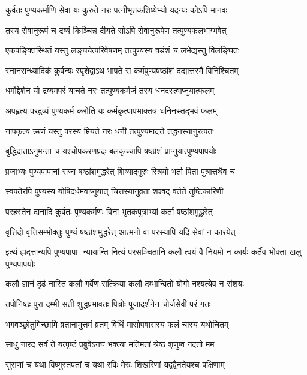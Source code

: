 \twolineshloka
{कुर्वतः पुण्यकर्माणि सेवां यः कुरुते नरः}
{पत्नीभृतकशिष्येभ्यो यदन्यः कोऽपि मानवः} %

\twolineshloka
{तस्य सेवानुरूपं च द्रव्यं किञ्चिन्न दीयते}
{सोऽपि सेवानुरूपेण तत्पुण्यफलभाग्भवेत्} %

\twolineshloka
{एकपङ्क्तिस्थितं यस्तु लङ्घयेत्परिवेषणम्}
{तत्पुण्यस्य षडंशं च लभेद्यस्तु विलङ्घितः} %

\twolineshloka
{स्नानसन्ध्यादिकं कुर्वन्यः स्पृशेद्वाऽथ भाषते}
{स कर्मपुण्यषष्ठांशं दद्यात्तस्मै विनिश्चितम्} %

\twolineshloka
{धर्मोद्देशेन यो द्रव्यमपरं याचते नरः}
{तत्पुण्यकर्मजं तस्य धनदस्त्वाप्नुयात्फलम्} %

\twolineshloka
{अपहृत्य परद्रव्यं पुण्यकर्म करोति यः}
{कर्मकृत्पापभाक्तत्र धनिनस्तद्भवं फलम्} %

\twolineshloka
{नापकृत्य ऋणं यस्तु परस्य म्रियते नरः}
{धनी तत्पुण्यमादत्ते तद्धनस्यानुरूपतः} %

\twolineshloka
{बुद्धिदाताऽनुमन्ता च यश्चोपकरणप्रदः}
{बलकृच्चापि षष्ठांशं प्राप्नुयात्पुण्यपापयोः} %

\twolineshloka
{प्रजाभ्यः पुण्यपापानां राजा षष्ठांशमुद्धरेत्}
{शिष्याद्गुरुः स्त्रियो भर्ता पिता पुत्रात्तथैव च} %

\twolineshloka
{स्वपतेरपि पुण्यस्य योषिदर्धमवाप्नुयात्}
{चित्तस्यानुव्रता शश्वद् वर्तते तुष्टिकारिणी} %

\twolineshloka
{परहस्तेन दानादि कुर्वतः पुण्यकर्मणः}
{विना भृतकपुत्राभ्यां कर्ता षष्ठांशमुद्धरेत्} %

\twolineshloka
{वृत्तिदो वृत्तिसम्भोक्तुः पुण्यं षष्ठांशमुद्धरेत्}
{आत्मनो वा परस्यापि यदि सेवां न कारयेत्} %

\fourlineindentedshloka
{इत्थं ह्यदत्तान्यपि पुण्यपापा-}
{न्यायान्ति नित्यं परसञ्चितानि}
{कलौ त्वयं वै नियमो न कार्यः}
{कर्तैव भोक्ता खलु पुण्यपापयोः} %

\twolineshloka
{कलौ ज्ञानं दृढं नास्ति कलौ गर्वेण सत्क्रिया}
{कलौ दम्भान्वितो योगो नश्यत्येव न संशयः} %

\twolineshloka
{तपोनिष्ठः पुरा दम्भी सती शुद्धप्रभावतः}
{पित्रोः पूजादर्शनेन चोर्जसेवी परं गतः} %


\twolineshloka
{भगवञ्छ्रोतुमिच्छामि व्रतानामुत्तमं व्रतम्}
{विधिं मासोपवासस्य फलं चास्य यथोचितम्} %


\twolineshloka
{साधु नारद सर्वं ते यत्पृष्टं प्रब्रुवेऽनघ}
{भक्त्या मतिमतां श्रेष्ठ शृणुष्व गदतो मम} %

\twolineshloka
{सुराणां च यथा विष्णुस्तपतां च यथा रविः}
{मेरुः शिखरिणां यद्वद्वैनतेयश्च पक्षिणाम्} %

